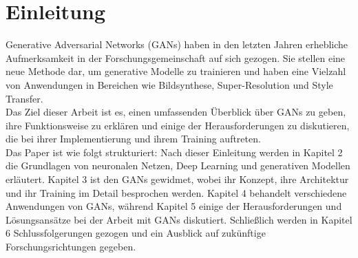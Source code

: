 \chapter{Einleitung}

\noindent Generative Adversarial Networks (GANs) haben in den letzten Jahren erhebliche Aufmerksamkeit in der Forschungsgemeinschaft auf sich gezogen. Sie stellen eine neue Methode dar, um generative Modelle zu trainieren und haben eine Vielzahl von Anwendungen in Bereichen wie Bildsynthese, Super-Resolution und Style Transfer. \\

\noindent Das Ziel dieser Arbeit ist es, einen umfassenden Überblick über GANs zu geben, ihre Funktionsweise zu erklären und einige der Herausforderungen zu diskutieren, die bei ihrer Implementierung und ihrem Training auftreten. \\

\noindent Das Paper ist wie folgt strukturiert: Nach dieser Einleitung werden in Kapitel 2 die Grundlagen von neuronalen Netzen, Deep Learning und generativen Modellen erläutert. Kapitel 3 ist den GANs gewidmet, wobei ihr Konzept, ihre Architektur und ihr Training im Detail besprochen werden. Kapitel 4 behandelt verschiedene Anwendungen von GANs, während Kapitel 5 einige der Herausforderungen und Lösungsansätze bei der Arbeit mit GANs diskutiert. Schließlich werden in Kapitel 6 Schlussfolgerungen gezogen und ein Ausblick auf zukünftige Forschungsrichtungen gegeben. \\